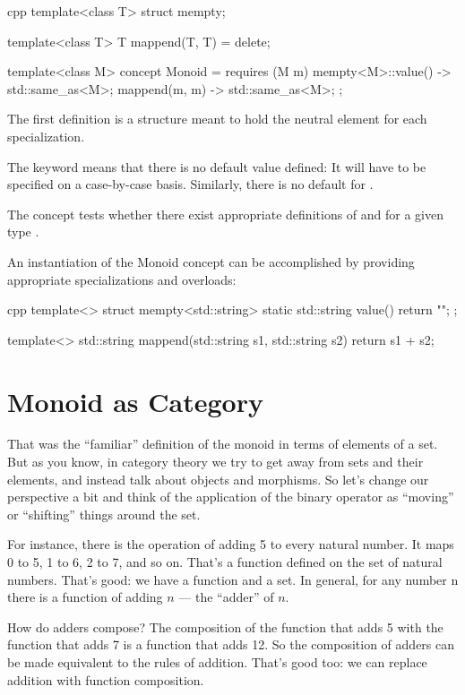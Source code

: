 \begin{snip}{cpp}
template<class T>
struct mempty;

template<class T>
T mappend(T, T) = delete;

template<class M>
concept Monoid = requires (M m) {
    { mempty<M>::value() } -> std::same_as<M>;
    { mappend(m, m) } -> std::same_as<M>;
};
\end{snip}
The first definition is a structure meant to hold the neutral element for each
specialization.

The keyword  means that there is no default value
defined: It will have to be specified on a case-by-case basis.
Similarly, there is no default for .

The concept  tests whether there exist appropriate definitions of
 and  for a given type .

An instantiation of the Monoid concept can be accomplished by providing
appropriate specializations and overloads:

\begin{snip}{cpp}
template<>
struct mempty<std::string> {
    static std::string value() { return ""; }
};

template<>
std::string mappend(std::string s1, std::string s2) {
    return s1 + s2;
}
\end{snip}

\section{Monoid as Category}

That was the ``familiar'' definition of the monoid in terms of elements
of a set. But as you know, in category theory we try to get away from
sets and their elements, and instead talk about objects and morphisms.
So let's change our perspective a bit and think of the application of
the binary operator as ``moving'' or ``shifting'' things around the set.

For instance, there is the operation of adding 5 to every natural
number. It maps 0 to 5, 1 to 6, 2 to 7, and so on. That's a function
defined on the set of natural numbers. That's good: we have a function
and a set. In general, for any number n there is a function of adding $n$
--- the ``adder'' of $n$.

How do adders compose? The composition of the function that adds 5 with
the function that adds 7 is a function that adds 12. So the composition
of adders can be made equivalent to the rules of addition. That's good
too: we can replace addition with function composition.


